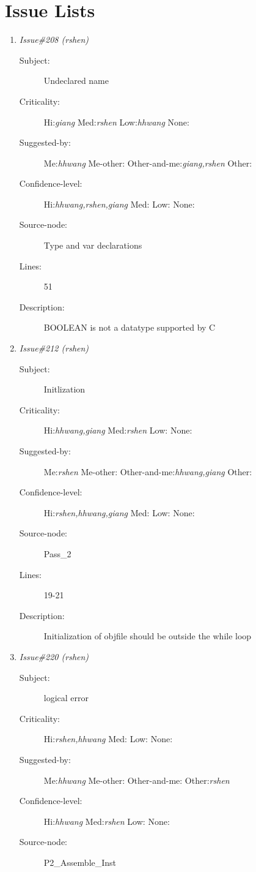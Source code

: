 \section{Issue Lists}
\begin{enumerate}
\item {\it Issue\#208 (rshen)}
\begin{description}
\item [Subject:] Undeclared name
\item [Criticality:] Hi:{\it giang} Med:{\it rshen} Low:{\it hhwang} None:{\it }
\item [Suggested-by:] Me:{\it hhwang} Me-other:{\it } Other-and-me:{\it giang,rshen} Other:{\it }
\item [Confidence-level:] Hi:{\it hhwang,rshen,giang} Med:{\it } Low:{\it } None:{\it }
\item [Source-node:] Type and var declarations

\item [Lines:] 51

\item [Description:] BOOLEAN is not a datatype supported by C
\end{description}
\item {\it Issue\#212 (rshen)}
\begin{description}
\item [Subject:] Initlization
\item [Criticality:] Hi:{\it hhwang,giang} Med:{\it rshen} Low:{\it } None:{\it }
\item [Suggested-by:] Me:{\it rshen} Me-other:{\it } Other-and-me:{\it hhwang,giang} Other:{\it }
\item [Confidence-level:] Hi:{\it rshen,hhwang,giang} Med:{\it } Low:{\it } None:{\it }
\item [Source-node:] Pass\_2

\item [Lines:] 19-21

\item [Description:] Initialization of objfile should be outside the while loop
\end{description}
\item {\it Issue\#220 (rshen)}
\begin{description}
\item [Subject:] logical error
\item [Criticality:] Hi:{\it rshen,hhwang} Med:{\it } Low:{\it } None:{\it }
\item [Suggested-by:] Me:{\it hhwang} Me-other:{\it } Other-and-me:{\it } Other:{\it rshen}
\item [Confidence-level:] Hi:{\it hhwang} Med:{\it rshen} Low:{\it } None:{\it }
\item [Source-node:] P2\_Assemble\_Inst


\end{description}
\end{enumerate}
